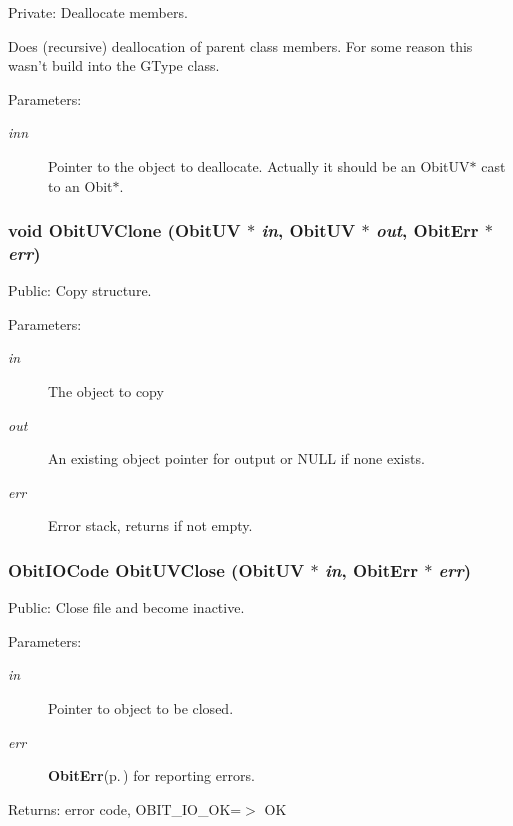 Private: Deallocate members. 

Does (recursive) deallocation of parent class members. For some reason this wasn't build into the GType class. \begin{Desc}
\item[Parameters:]
\begin{description}
\item[{\em inn}]Pointer to the object to deallocate. Actually it should be an Obit\-UV$\ast$ cast to an Obit$\ast$. \end{description}
\end{Desc}
\subsubsection{\setlength{\rightskip}{0pt plus 5cm}void Obit\-UVClone ({\bf Obit\-UV} $\ast$ {\em in}, {\bf Obit\-UV} $\ast$ {\em out}, {\bf Obit\-Err} $\ast$ {\em err})}\label{ObitUV_8c_a18}


Public: Copy structure. 

\begin{Desc}
\item[Parameters:]
\begin{description}
\item[{\em in}]The object to copy \item[{\em out}]An existing object pointer for output or NULL if none exists. \item[{\em err}]Error stack, returns if not empty. \end{description}
\end{Desc}
\subsubsection{\setlength{\rightskip}{0pt plus 5cm}Obit\-IOCode Obit\-UVClose ({\bf Obit\-UV} $\ast$ {\em in}, {\bf Obit\-Err} $\ast$ {\em err})}\label{ObitUV_8c_a20}


Public: Close file and become inactive. 

\begin{Desc}
\item[Parameters:]
\begin{description}
\item[{\em in}]Pointer to object to be closed. \item[{\em err}]{\bf Obit\-Err}{\rm (p.\,\pageref{structObitErr})} for reporting errors. \end{description}
\end{Desc}
\begin{Desc}
\item[Returns:]error code, OBIT\_\-IO\_\-OK=$>$ OK \end{Desc}

